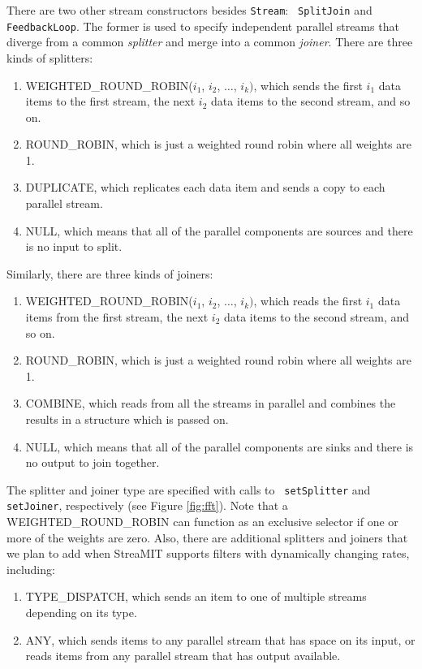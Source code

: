 There are two other stream constructors besides {\tt Stream}: {\tt
SplitJoin} and {\tt FeedbackLoop}.  The former is used to specify
independent parallel streams that diverge from a common {\it splitter}
and merge into a common {\it joiner}.  There are three kinds of
splitters:
\begin{enumerate}
\item WEIGHTED\_ROUND\_ROBIN($i_1$, $i_2$, $\dots$, $i_k)$,
which sends the first $i_1$ data items to the first stream, the next
$i_2$ data items to the second stream, and so on.
\item ROUND\_ROBIN, which is just a weighted round robin where all
weights are 1.
\item DUPLICATE, which replicates each data item and sends a copy to each
parallel stream.
\item NULL, which means that all of the parallel components are
sources and there is no input to split.
\end{enumerate}
Similarly, there are three kinds of joiners: 
\begin{enumerate}
\item WEIGHTED\_ROUND\_ROBIN($i_1$, $i_2$, $\dots$, $i_k)$, which reads the
first $i_1$ data items from the first stream, the next $i_2$ data
items to the second stream, and so on.
\item ROUND\_ROBIN, which is just a weighted round robin where all
weights are 1.
\item COMBINE, which reads from all the streams in parallel and
combines the results in a structure which is passed on.
\item NULL, which means that all of the parallel components are sinks
and there is no output to join together.
\end{enumerate}
The splitter and joiner type are specified with calls to {\tt
setSplitter} and {\tt setJoiner}, respectively (see Figure
\ref{fig:fft}).  Note that a WEIGHTED\_ROUND\_ROBIN can function as an
exclusive selector if one or more of the weights are zero.  Also,
there are additional splitters and joiners that we plan to add when
StreaMIT supports filters with dynamically changing rates, including:
\begin{enumerate}
\item TYPE\_DISPATCH, which sends an item to one of multiple streams
depending on its type.
\item ANY, which sends items to any parallel stream that has space on
its input, or reads items from any parallel stream that has output
available.
\end{enumerate}


